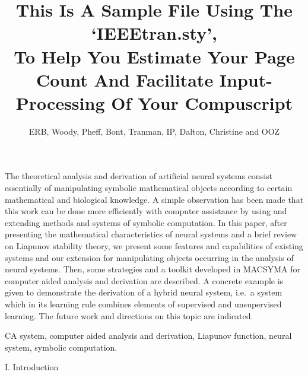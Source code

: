\title{This Is A Sample File Using The `IEEEtran.sty',\\ To Help You
Estimate Your Page Count And Facilitate Input-Processing Of Your
Compuscript} 
\author{ERB, Woody, Pheff, Bont, Tranman, IP, Dalton, Christine and OOZ}


\maketitle               
\begin{abstracttext}
The theoretical analysis and derivation of artificial neural systems
consist 
essentially 
of manipulating symbolic mathematical objects according to certain 
mathematical and biological knowledge. A simple observation has been
made 
that this work can be done more efficiently with computer assistance
by using and extending methods and systems of symbolic computation. 
In this paper, after presenting the mathematical characteristics of
neural 
systems and a brief review on Liapunov stability theory, we present some
features and 
capabilities of existing systems and our extension
for manipulating objects occurring in the analysis of neural systems. 
Then, some strategies and a toolkit developed in MACSYMA for computer
aided 
analysis and derivation are described. A concrete example is given to 
demonstrate the derivation of a hybrid neural system, i.e.\ a system
which in its 
learning rule combines elements of supervised and unsupervised learning. 
The future work and directions on this topic are indicated.
\end{abstracttext}
\begin{keywords}
CA system, computer aided analysis and derivation,  
Liapunov function, neural system, symbolic computation.
\end{keywords}




\bigskip
\noindent    
\centerline{\sc I. Introduction}

